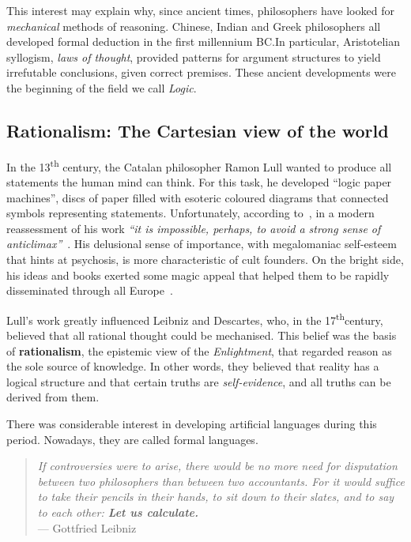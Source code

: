This interest may explain why, since ancient times, philosophers have looked for \emph{mechanical} methods of reasoning. Chinese, Indian and Greek philosophers all developed formal deduction in the first millennium BC.\@ In particular, Aristotelian syllogism, \emph{laws of thought}, provided patterns for argument structures to yield irrefutable conclusions, given correct premises. These ancient developments were the beginning of the field we call \emph{Logic}.

\subsection{Rationalism: The Cartesian view of the world}

In the 13\textsuperscript{th} century, the Catalan philosopher Ramon Lull wanted to produce all statements the human mind can think. For this task, he developed ``logic paper machines'', discs of paper filled with esoteric coloured diagrams that connected symbols representing statements.
Unfortunately, according to~\citeauthor{gardner:1959},  in a modern reassessment of his work \textit{``it is impossible, perhaps, to avoid a strong sense of anticlimax''}~\cite{gardner:1959}. His delusional sense of importance, with megalomaniac self-esteem that hints at psychosis, is more characteristic of cult founders. On the bright side, his ideas and books exerted some magic appeal that helped them to be rapidly disseminated through all Europe~\cite{gardner:1959}.

Lull's work greatly influenced Leibniz and Descartes, who, in the 17\textsuperscript{th}century, believed that all rational thought could be mechanised. This belief was the basis of \textbf{rationalism}, the epistemic view of the \emph{Enlightment}, that regarded reason as the sole source of knowledge. In other words, they believed that reality has a logical structure and that certain truths are \emph{self-evidence}, and all truths can be derived from them.

There was considerable interest in developing artificial languages during this period. Nowadays, they are called formal languages.
\begin{quotation}
	\small \emph{If controversies were to arise, there would be no more need for disputation between two philosophers than between two accountants. For it would suffice to take their pencils in their hands, to sit down to their slates, and to say to each other: \textbf{Let us calculate.}}\\
	\flushright --- Gottfried Leibniz
\end{quotation}

